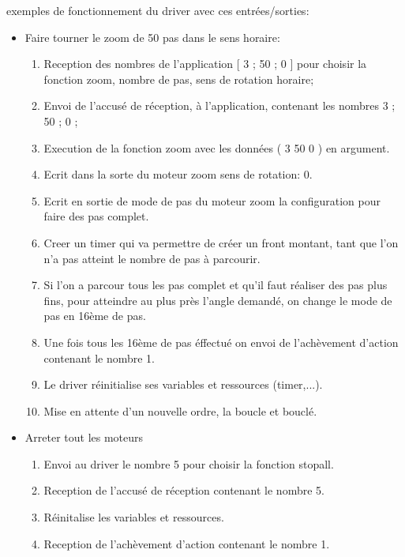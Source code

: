   exemples de fonctionnement du driver avec ces entrées/sorties: 
\begin{itemize}
	\item Faire tourner le zoom de 50 pas dans le sens horaire:
	\begin{enumerate}
		\item Reception des nombres de l'application [ 3 ; 50 ; 0 ] pour choisir la fonction zoom, nombre de pas, sens de rotation horaire;
		\item Envoi de l'accusé de réception, à l'application, contenant les nombres 3 ; 50 ; 0 ;
		\item Execution de la fonction zoom avec les données ( 3 50 0 ) en argument.
		\item Ecrit dans la sorte du moteur zoom sens de rotation: 0.
		\item Ecrit en sortie de mode de pas du moteur zoom la configuration pour faire des pas complet. 
		\item Creer un timer qui va permettre de créer un front montant, tant que l'on n'a pas atteint le nombre de pas à parcourir.
		\item Si l'on a parcour tous les pas complet et qu'il faut réaliser des pas plus fins, pour atteindre au plus près l'angle demandé, on change le mode de pas en 16ème de pas. 
		\item Une fois tous les 16ème de pas éffectué on envoi de l'achèvement d'action contenant le nombre 1.
		\item Le driver réinitialise ses variables et ressources (timer,...).
		\item Mise en attente d'un nouvelle ordre, la boucle et bouclé.
	\end{enumerate}
	\item Arreter tout les moteurs
	\begin{enumerate}
		\item Envoi au driver le nombre 5 pour choisir la fonction stopall.
		\item Reception de l'accusé de réception contenant le nombre 5.
		\item Réinitalise les variables et ressources.
		\item Reception de l'achèvement d'action contenant le nombre 1.
	\end{enumerate}
\end{itemize}


